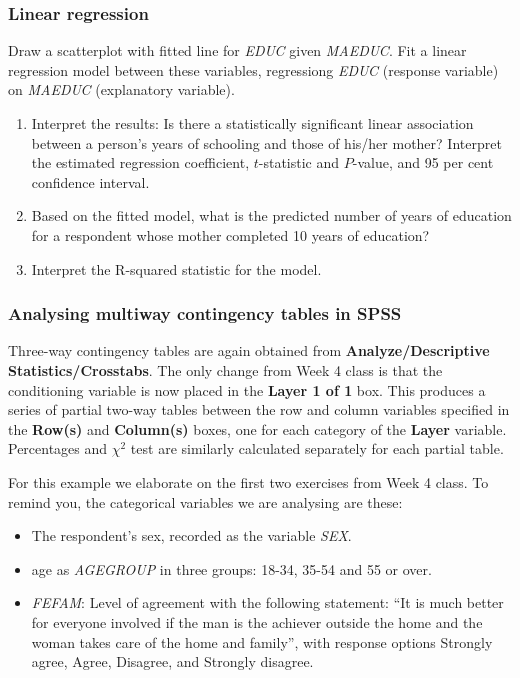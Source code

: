 \subsubsection{Linear regression}
Draw a scatterplot with fitted line
for \emph{EDUC} given \emph{MAEDUC}.
Fit a linear regression
model between these variables, regressiong \emph{EDUC} (response variable)
on \emph{MAEDUC} (explanatory variable).
\begin{enumerate}

\item
Interpret the results: Is there a statistically significant linear association between
a person's years of schooling and those of his/her mother? Interpret the estimated
regression coefficient, $t$-statistic and
$P$-value, and 95 per cent confidence interval.
\item
Based on the fitted model, what is the predicted number of years of education for
a respondent whose mother completed 10 years of education?
\item
Interpret the R-squared statistic for the model.
\end{enumerate}

\subsubsection{Analysing multiway contingency tables in SPSS}

Three-way contingency tables are again obtained from
\textbf{Analyze/Descriptive Statistics/Crosstabs}. The only change
from Week 4 class is that the conditioning variable is now placed in
the \textbf{Layer 1 of 1} box. This produces a series of partial two-way
tables between the row and column variables specified in the
\textbf{Row(s)} and \textbf{Column(s)} boxes, one for each category of
the \textbf{Layer} variable. Percentages and $\chi^{2}$ test are similarly
calculated separately for each partial table.

For this example we elaborate on the first two exercises from Week 4 class. To remind
you, the categorical variables we are analysing are these:
\begin{itemize}
\item
The respondent's sex, recorded as the variable \emph{SEX}.
\item
age as \emph{AGEGROUP} in three groups: 18-34, 35-54 and 55 or over.
\item
\emph{FEFAM}: Level of agreement with the following statement: ``It is much better for
everyone involved if the man is the achiever outside the home and the woman takes care
of the home and family'', with response options Strongly agree, Agree,
Disagree, and Strongly disagree.
\end{itemize}


